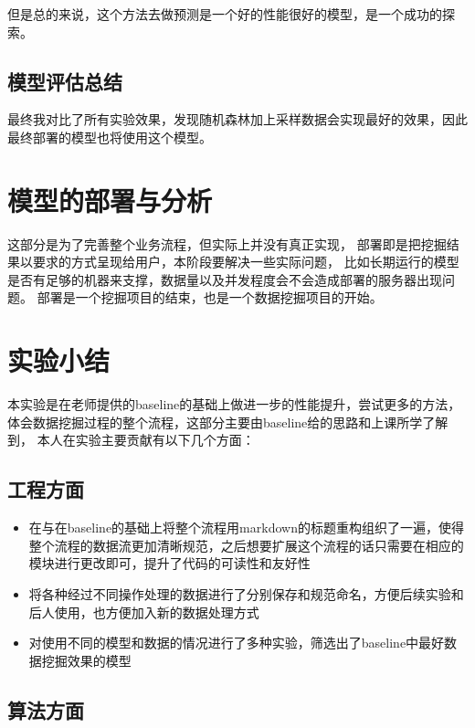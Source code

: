 \documentclass{article}
\begin{document}
但是总的来说，这个方法去做预测是一个好的性能很好的模型，是一个成功的探索。

\subsection{模型评估总结}

最终我对比了所有实验效果，发现随机森林加上采样数据会实现最好的效果，因此最终部署的模型也将使用这个模型。

\section{模型的部署与分析}

这部分是为了完善整个业务流程，但实际上并没有真正实现，
部署即是把挖掘结果以要求的方式呈现给用户，本阶段要解决一些实际问题，
比如长期运行的模型是否有足够的机器来支撑，数据量以及并发程度会不会造成部署的服务器出现问题。
部署是一个挖掘项目的结束，也是一个数据挖掘项目的开始。

\section{实验小结}

本实验是在老师提供的baseline的基础上做进一步的性能提升，尝试更多的方法，体会数据挖掘过程的整个流程，这部分主要由baseline给的思路和上课所学了解到，
本人在实验主要贡献有以下几个方面：

\subsection{工程方面}

\begin{itemize}
	\item 在与在baseline的基础上将整个流程用markdown的标题重构组织了一遍，使得整个流程的数据流更加清晰规范，之后想要扩展这个流程的话只需要在相应的模块进行更改即可，提升了代码的可读性和友好性
	\item 将各种经过不同操作处理的数据进行了分别保存和规范命名，方便后续实验和后人使用，也方便加入新的数据处理方式
	\item 对使用不同的模型和数据的情况进行了多种实验，筛选出了baseline中最好数据挖掘效果的模型
\end{itemize}

\subsection{算法方面}
\end{document}
